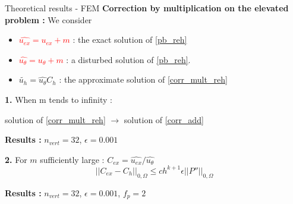 \begin{frame}{Theoretical results - FEM}
    \textbf{Correction by multiplication on the elevated problem :} We consider 
        
    \begin{itemize}
        \item \textcolor{red}{$\hat{u_{ex}}=u_{ex}+m$} : the exact solution of \eqref{pb_reh}
        \item \textcolor{red}{$\hat{u_\theta} = u_\theta+m$} : a disturbed solution of \eqref{pb_reh}.
        \item $\tilde{u_h}=\hat{u_\theta}C_h$ : the approximate solution of \eqref{corr_mult_reh}
    \end{itemize}

        
    \begin{minipage}{0.48\linewidth}
        \textbf{1.} When m tends to infinity : 
            \begin{center}
                solution of \eqref{corr_mult_reh} $\rightarrow$ solution of \eqref{corr_add}
            \end{center}

            \small
            \textbf{Results :} $n_{vert}=32$, $\epsilon=0.001$ \\
            
            \centering
    \end{minipage} \;
    \begin{minipage}{0.48\linewidth}
        \textbf{2.} For $m$ sufficiently large : $C_{ex}=\hat{u_{ex}}/\hat{u_\theta}$
            \begin{equation*}
                \left|\left|C_{ex}-C_h\right|\right|_{0,\Omega}\le ch^{k+1}\epsilon\left|\left|P''\right|\right|_{0,\Omega}
            \end{equation*}

            \small
            \textbf{Results :} $n_{vert}=32$, $\epsilon=0.001$, $f_p=2$ \\
    
            \centering
    \end{minipage}
    
    
\end{frame}
